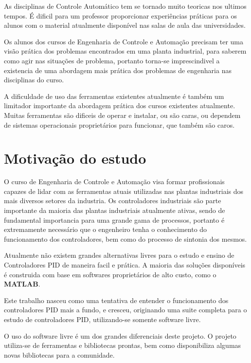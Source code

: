     As disciplinas de Controle Automático tem se tornado muito teoricas nos ultimos
    tempos. É dificil para um professor proporcionar experiências práticas para os
    alunos com o material atualmente disponível nas salas de aula das universidades.

    Os alunos dos cursos de Engenharia de Controle e Automação precisam ter uma
    visão prática dos problemas encontrados em uma planta industrial, para saberem
    como agir nas situações de problema, portanto torna-se imprescindivel a existencia
    de uma abordagem mais prática dos problemas de engenharia nas disciplinas do curso.

    A dificuldade de uso das ferramentas existentes atualmente é também um limitador
    importante da abordagem prática dos cursos existentes atualmente. Muitas ferramentas
    são dificeis de operar e instalar, ou são caras, ou dependem de sistemas operacionais
    proprietários para funcionar, que também são caros.

\section{Motivação do estudo}

    O curso de Engenharia de Controle e Automação visa formar profissionais
    capazes de lidar com as ferramentas atuais utilizadas nas plantas industriais
    dos mais diversos setores da industria. Os controladores industriais são
    parte importante da maioria das plantas industriais atualmente ativas,
    sendo de fundamental importancia para uma grande gama de processos, portanto
    é extremamente necessário que o engenheiro tenha o conhecimento do funcionamento
    dos controladores, bem como do processo de sintonia dos mesmos.
    
    Atualmente não existem grandes alternativas livres para o estudo e ensino
    de Controladores PID de maneira facil e prática. A maioria das soluções
    disponíveis é construida com base em softwares proprietários de alto custo,
    como o \textbf{MATLAB}\textregistered.
    
    Este trabalho nasceu como uma tentativa de entender o funcionamento dos
    controladores PID mais a fundo, e cresceu, originando uma suite completa
    para o estudo de controladores PID, utilizando-se somente software livre.

    O uso do software livre é um dos grandes diferenciais deste projeto. O projeto
    utiliza-se de ferramentas e bibliotecas prontas, bem como disponibiliza algumas
    novas bibliotecas para a comunidade.

